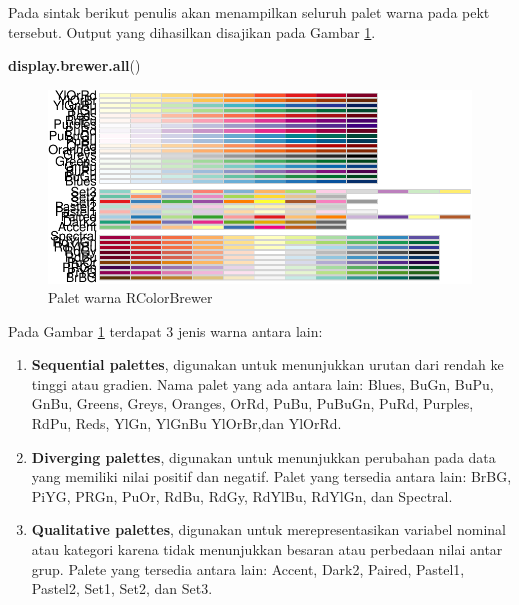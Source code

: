 \documentclass[]{book}
\newenvironment{Shaded}{\begin{snugshade}}{\end{snugshade}}
\newcommand{\KeywordTok}[1]{\textcolor[rgb]{0.13,0.29,0.53}{\textbf{#1}}}
\newcommand{\NormalTok}[1]{#1}
\providecommand{\tightlist}{%
  \setlength{\itemsep}{0pt}\setlength{\parskip}{0pt}}
\begin{document}
Pada sintak berikut penulis akan menampilkan seluruh palet warna pada
pekt tersebut. Output yang dihasilkan disajikan pada Gambar
\ref{fig:ggcolor5}.

\begin{Shaded}
\begin{Highlighting}[]
\KeywordTok{display.brewer.all}\NormalTok{()}
\end{Highlighting}
\end{Shaded}

\begin{figure}

{\centering \includegraphics{EnvStat_files/figure-latex/ggcolor5-1} 

}

\caption{Palet warna RColorBrewer}\label{fig:ggcolor5}
\end{figure}

Pada Gambar \ref{fig:ggcolor5} terdapat 3 jenis warna antara lain:

\begin{enumerate}
\def\labelenumi{\arabic{enumi}.}
\tightlist
\item
  \textbf{Sequential palettes}, digunakan untuk menunjukkan urutan dari
  rendah ke tinggi atau gradien. Nama palet yang ada antara lain: Blues,
  BuGn, BuPu, GnBu, Greens, Greys, Oranges, OrRd, PuBu, PuBuGn, PuRd,
  Purples, RdPu, Reds, YlGn, YlGnBu YlOrBr,dan YlOrRd.
\item
  \textbf{Diverging palettes}, digunakan untuk menunjukkan perubahan
  pada data yang memiliki nilai positif dan negatif. Palet yang tersedia
  antara lain: BrBG, PiYG, PRGn, PuOr, RdBu, RdGy, RdYlBu, RdYlGn, dan
  Spectral.
\item
  \textbf{Qualitative palettes}, digunakan untuk merepresentasikan
  variabel nominal atau kategori karena tidak menunjukkan besaran atau
  perbedaan nilai antar grup. Palete yang tersedia antara lain: Accent,
  Dark2, Paired, Pastel1, Pastel2, Set1, Set2, dan Set3.
\end{enumerate}
\end{document}
